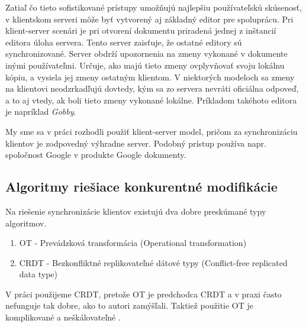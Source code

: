 Zatiaľ čo tieto sofistikované prístupy umožňujú najlepšiu používateľskú skúsenosť,
v klientskom serveri môže byť vytvorený aj základný editor pre spoluprácu. Pri klient-server 
scenári je pri otvorení dokumentu priradená jednej z inštancií editora úloha servera.
Tento server zaisťuje, že ostatné editory sú synchronizované. Server obdrží upozornenia
na zmeny vykonané v dokumente inými používateľmi. 
Určuje, ako majú tieto zmeny ovplyvňovať svoju lokálnu kópiu, a vysiela jej zmeny ostatným klientom.
V niektorých modeloch sa zmeny na klientovi neodzrkadľujú dovtedy,
kým sa zo servera nevráti oficiálna odpoveď, a to aj vtedy, ak boli tieto zmeny vykonané lokálne.
Príkladom takéhoto editora je napríklad \textit{Gobby}.

My sme sa v práci rozhodli použiť klient-server model, pričom za synchronizáciu klientov
je zodpovedný výhradne server. Podobný prístup používa napr. spoločnost Google v produkte 
Google dokumenty.

\subsection{Algoritmy riešiace konkurentné modifikácie}
Na riešenie synchronizácie klientov existujú dva dobre preskúmané typy algoritmov.
\begin{enumerate}
  \item OT - Prevádzková transformácia (Operational transformation)
  \item CRDT - Bezkonfliktné replikovateľné dátové typy (Conflict-free replicated data type)
\end{enumerate}

V práci použijeme CRDT, pretože OT je predchodca CRDT a v praxi často nefunguje tak dobre,
ako to autori zamýšľali. Taktiež použitie OT je komplikované a neškálovateľné \cite{ot_nonscalable}.
